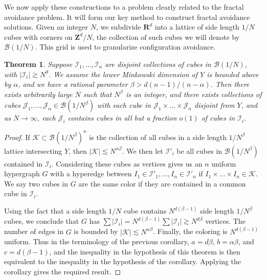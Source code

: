 \documentclass{article}
\theoremstyle{plain}
\theoremstyle{plain}
\newtheorem{theorem}{Theorem}
\begin{document}
\begin{multicols}{2}
We now apply these constructions to a problem clearly related to the fractal avoidance problem. It will form our key method to construct fractal avoidance solutions. Given an integer $N$, we subdivide $\mathbf{R}^d$ into a lattice of side length $1/N$ cubes with corners on $\mathbf{Z}^d/N$, the collection of such cubes we will denote by $\mathcal{B}(1/N)$. This grid is used to granularize configuration avoidance.

\begin{theorem}
	Suppose $\mathcal{I}_1, \dots, \mathcal{I}_n$ are disjoint collections of cubes in $\mathcal{B}(1/N)$, with $|\mathcal{I}_i| \gtrsim N^d$. We assume the lower Minkowski dimension of $Y$ is bounded above by $\alpha$, and we have a rational parameter $\beta > d(n-1)/(n-\alpha)$. Then there exists arbitrarily large $N$ such that $N^\beta$ is an integer, and there exists collections of cubes $\mathcal{J}_1, \dots, \mathcal{J}_n \in \mathcal{B}(1/N^\beta)$ with each cube in $\mathcal{J}_1 \times \dots \times \mathcal{J}_n$ disjoint from $Y$, and as $N \to \infty$, each $\mathcal{J}_i$ contains cubes in all but a fraction $o(1)$ of cubes in $\mathcal{I}_i$.
\end{theorem}
\begin{proof}
	If $\mathcal{K} \subset \mathcal{B}(1/N^\beta)^n$ is the collection of all cubes in a side length $1/N^\beta$ lattice intersecting $Y$, then $|\mathcal{K}| \lesssim N^{\alpha \beta}$. We then let $\mathcal{I}'_i$ be all cubes in $\mathcal{B}(1/N^\beta)$ contained in $\mathcal{I}_i$. Considering these cubes as vertices gives us an $n$ uniform hypergraph $G$ with a hyperedge between $I_1 \in \mathcal{I}'_1, \dots, I_n \in \mathcal{I}'_n$ if $I_1 \times \dots \times I_n \in \mathcal{K}$. We say two cubes in $G$ are the same color if they are contained in a common cube in $\mathcal{I}_i$.

	Using the fact that a side length $1/N$ cube contains $N^{d(\beta - 1)}$ side length $1/N^\beta$ cubes, we conclude that $G$ has $\sum |\mathcal{I}_i| = N^{d(\beta - 1)} \sum |\mathcal{I}_i| \gtrsim N^{d \beta}$ vertices. The number of edges in $G$ is bounded by $|\mathcal{K}| \lesssim N^{\alpha \beta}$. Finally, the coloring is $N^{d(\beta - 1)}$ uniform. Thus in the terminology of the previous corollary, $a = d \beta$, $b = \alpha \beta$, and $c = d(\beta - 1)$, and the inequality in the hypothesis of this theorem is then equivalent to the inequality in the hypothesis of the corollary. Applying the corollary gives the required result.
\end{proof}


\end{multicols}
\end{document}
